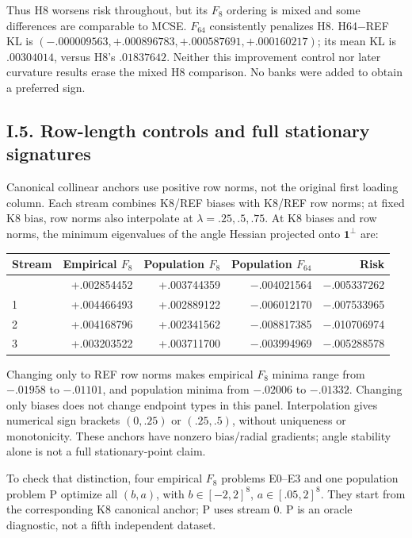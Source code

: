 \documentclass{article}
\begin{document}
Thus H8 worsens risk throughout, but its \(F_8\) ordering is mixed and
some differences are comparable to MCSE. \(F_{64}\) consistently
penalizes H8. H64−REF KL is
\((−.000009563,+.000896783,+.000587691,+.000160217)\); its mean KL is
\(.00304014\), versus H8's \(.01837642\). Neither this improvement
control nor later curvature results erase the mixed H8 comparison. No
banks were added to obtain a preferred sign.

\subsection*{I.5. Row-length controls and full stationary
signatures}\label{i.5.-row-length-controls-and-full-stationary-signatures}

Canonical collinear anchors use positive row norms, not the original
first loading column. Each stream combines K8/REF biases with K8/REF row
norms; at fixed K8 bias, row norms also interpolate at
\(\lambda=.25,.5,.75\). At K8 biases and row norms, the minimum
eigenvalues of the angle Hessian projected onto \(\mathbf1^\perp\) are:

\begin{longtable}[]{@{}lrrrr@{}}
\toprule\noalign{}
Stream & Empirical \(F_8\) & Population \(F_8\) & Population \(F_{64}\)
& Risk \\
\midrule\noalign{}
\endhead
\bottomrule\noalign{}
\endlastfoot
0 & +.002854452 & +.003744359 & −.004021564 & −.005337262 \\
1 & +.004466493 & +.002889122 & −.006012170 & −.007533965 \\
2 & +.004168796 & +.002341562 & −.008817385 & −.010706974 \\
3 & +.003203522 & +.003711700 & −.003994969 & −.005288578 \\
\end{longtable}

Changing only to REF row norms makes empirical \(F_8\) minima range from
\(−.01958\) to \(−.01101\), and population minima from \(−.02006\) to
\(−.01332\). Changing only biases does not change endpoint types in this
panel. Interpolation gives numerical sign brackets \((0,.25)\) or
\((.25,.5)\), without uniqueness or monotonicity. These anchors have
nonzero bias/radial gradients; angle stability alone is not a full
stationary-point claim.

To check that distinction, four empirical \(F_8\) problems E0--E3 and
one population problem P optimize all \((b,a)\), with \(b\in[-2,2]^8\),
\(a\in[.05,2]^8\). They start from the corresponding K8 canonical
anchor; P uses stream 0. P is an oracle diagnostic, not a fifth
independent dataset.
\end{document}
